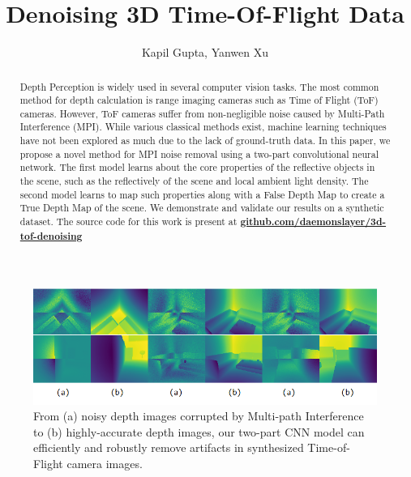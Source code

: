 \documentclass[runningheads]{llncs}
\begin{document}
\pagestyle{headings}
\mainmatter
\def\ECCV18SubNumber{***}  %

\title{Denoising 3D Time-Of-Flight Data} %

\titlerunning{ECCV-19 \ECCV18SubNumber}

\authorrunning{ECCV-19 \ECCV18SubNumber}

\author{Kapil Gupta, Yanwen Xu}


\maketitle

\begin{figure}
    \centering
    \includegraphics[scale=0.6]{img/depthmap/Figure_1.png}
    \caption{
    From (a) noisy depth images corrupted by Multi-path Interference  to (b) highly-accurate depth images, our two-part CNN model can efficiently and robustly remove artifacts in synthesized Time-of-Flight camera images. }
    \label{fig:result_raw}
\end{figure}

\begin{abstract}
Depth Perception is widely used in several computer vision tasks. The most common method for depth calculation is range imaging cameras such as Time of Flight (ToF) cameras.  However, ToF cameras suffer from non-negligible noise caused by Multi-Path Interference (MPI). While various classical methods exist, machine learning techniques have not been explored as much due to the lack of ground-truth data. In this paper, we propose a novel method for MPI noise removal using a two-part convolutional neural network. The first model learns about the core properties of the reflective objects in the scene, such as the reflectively of the scene and local ambient light density.  The second model learns to map such properties along with a False Depth Map to create a True Depth Map of the scene. We demonstrate and validate our results on a synthetic dataset. The source code for this work is present at \href{https://github.com/daemonslayer/3d-tof-denoising.git}{\textbf{github.com/daemonslayer/3d-tof-denoising}}

\end{abstract}
\end{document}
